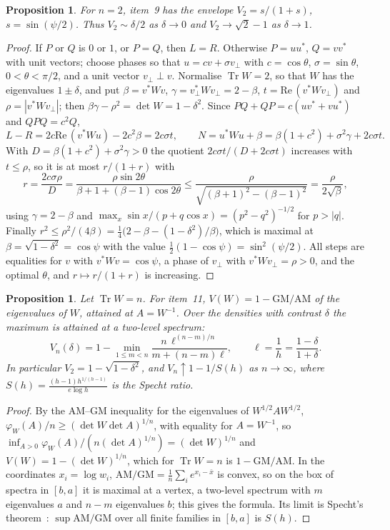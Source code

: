 \documentclass[11pt]{article}
\DeclareMathOperator{\Tr}{Tr}
\renewcommand{\Re}{\mathrm{Re}\,}
\theoremstyle{plain}
\newtheorem{proposition}[theorem]{Proposition}
\theoremstyle{definition}
\theoremstyle{remark}
\begin{document}
\begin{proposition}\label{prop:abed}
For $n=2$, item~9 has the envelope $V_2=s/(1+s)$, $s=\sin(\psi/2)$. Thus $V_2\sim\delta/2$ as $\delta\to0$ and
$V_2\to\sqrt2-1$ as $\delta\to1$.
\end{proposition}
\begin{proof}
If $P$ or $Q$ is $0$ or $1$, or $P=Q$, then $L=R$. Otherwise $P=uu^*$, $Q=vv^*$ with unit vectors; choose phases so that
$u=cv+\sigma v_\perp$ with $c=\cos\theta$, $\sigma=\sin\theta$, $0<\theta<\pi/2$, and a unit vector $v_\perp\perp v$.
Normalise $\Tr W=2$, so that $W$ has the eigenvalues $1\pm\delta$, and put $\beta=v^*Wv$, $\gamma=v_\perp^*Wv_\perp=2-\beta$,
$t=\Re(v^*Wv_\perp)$ and $\rho=|v^*Wv_\perp|$; then $\beta\gamma-\rho^2=\det W=1-\delta^2$. Since $PQ+QP=c(uv^*+vu^*)$
and $QPQ=c^2Q$,
\[
  L-R=2c\Re(v^*Wu)-2c^2\beta=2c\sigma t,\qquad N=u^*Wu+\beta=\beta(1+c^2)+\sigma^2\gamma+2c\sigma t .
\]
With $D=\beta(1+c^2)+\sigma^2\gamma>0$ the quotient $2c\sigma t/(D+2c\sigma t)$ increases with $t\le\rho$, so it is at most
$r/(1+r)$ with
\[
  r=\frac{2c\sigma\rho}{D}=\frac{\rho\sin2\theta}{\beta+1+(\beta-1)\cos2\theta}\le\frac{\rho}{\sqrt{(\beta+1)^2-(\beta-1)^2}}
  =\frac\rho{2\sqrt\beta},
\]
using $\gamma=2-\beta$ and $\max_x\sin x/(p+q\cos x)=(p^2-q^2)^{-1/2}$ for $p>|q|$. Finally
$r^2\le\rho^2/(4\beta)=\frac14\bigl(2-\beta-(1-\delta^2)/\beta\bigr)$, which is maximal at $\beta=\sqrt{1-\delta^2}=\cos\psi$
with the value $\frac12(1-\cos\psi)=\sin^2(\psi/2)$. All steps are equalities for $v$ with $v^*Wv=\cos\psi$, a phase of
$v_\perp$ with $v^*Wv_\perp=\rho>0$, and the optimal $\theta$, and $r\mapsto r/(1+r)$ is increasing.
\end{proof}

\begin{proposition}\label{prop:det}
Let $\Tr W=n$. For item~11, $V(W)=1-\mathrm{GM}/\mathrm{AM}$ of the eigenvalues of $W$, attained at $A=W^{-1}$. Over
the densities with contrast $\delta$ the maximum is attained at a two-level spectrum:
\[
  V_n(\delta)=1-\min_{1\le m<n}\frac{n\,\ell^{(n-m)/n}}{m+(n-m)\ell},\qquad\ell=\frac1h=\frac{1-\delta}{1+\delta}.
\]
In particular $V_2=1-\sqrt{1-\delta^2}$, and $V_n\uparrow1-1/S(h)$ as $n\to\infty$, where
$S(h)=\frac{(h-1)h^{1/(h-1)}}{e\log h}$ is the Specht ratio.
\end{proposition}
\begin{proof}
By the AM--GM inequality for the eigenvalues of $W^{1/2}AW^{1/2}$, $\varphi_W(A)/n\ge(\det W\det A)^{1/n}$, with
equality for $A=W^{-1}$, so $\inf_{A>0}\varphi_W(A)/(n(\det A)^{1/n})=(\det W)^{1/n}$ and $V(W)=1-(\det W)^{1/n}$, which
for $\Tr W=n$ is $1-\mathrm{GM}/\mathrm{AM}$. In the coordinates $x_i=\log w_i$, $\mathrm{AM}/\mathrm{GM}=\frac1n\sum_i
e^{x_i-\bar x}$ is convex, so on the box of spectra in $[b,a]$ it is maximal at a vertex, a two-level spectrum with $m$
eigenvalues $a$ and $n-m$ eigenvalues $b$; this gives the formula. Its limit is Specht's theorem~\cite{specht1960}:
$\sup\mathrm{AM}/\mathrm{GM}$ over all finite families in $[b,a]$ is $S(h)$.
\end{proof}
\end{document}
